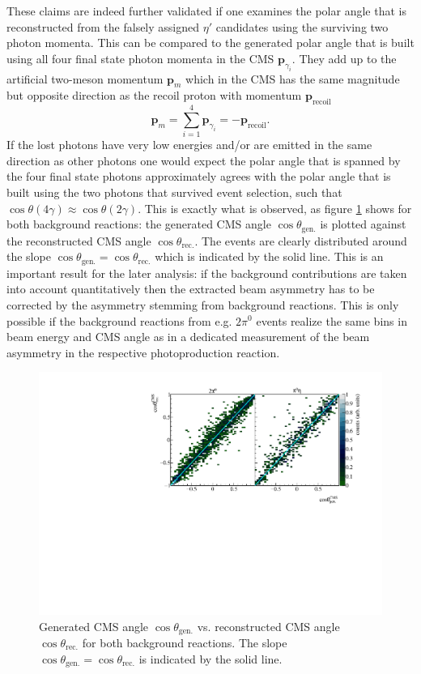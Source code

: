 These claims are indeed further validated if one examines the polar angle that is reconstructed from the falsely assigned $\eta'$ candidates using the surviving two photon momenta. This can be compared to the generated polar angle that is built using all four final state photon momenta in the CMS $\mathbf{p}_{\gamma_i}$. They add up to the artificial two-meson momentum $\mathbf{p}_m$ which in the CMS has the same magnitude but opposite direction as the recoil proton with momentum $\mathbf{p}_\text{recoil}$
$$
	\mathbf{p}_m=\sum_{i=1}^4\mathbf{p}_{\gamma_i}=-\mathbf{p}_\text{recoil}.
$$ If the lost photons have very low energies and/or are emitted in the same direction as other photons one would expect the polar angle that is spanned by the four final state photons approximately agrees with the polar angle that is built using the two photons that survived event selection, such that $\cos\theta(4\gamma)\approx\cos\theta(2\gamma)$. This is exactly what is observed, as figure \ref{fig:mccostheta} shows for both background reactions: the generated CMS angle $\cos\theta_\text{gen.}$ is plotted against the reconstructed CMS angle $\cos\theta_\text{rec.}$. The events are clearly distributed around the slope $\cos\theta_\text{gen.}=\cos\theta_\text{rec.}$ which is indicated by the solid line. This is an important result for the later analysis: if the background contributions are taken into account quantitatively then the extracted beam asymmetry has to be corrected by the asymmetry stemming from background reactions. This is only possible if the background reactions from e.g. $2\pi^0$ events realize the same bins in beam energy and CMS angle as in a dedicated measurement of the beam asymmetry in the respective photoproduction reaction. 
\begin{figure}[htbp]
	\centering
	\includegraphics[width=\linewidth]{../figs/hydrogen/mcgammas_ct.pdf}
	\caption{Generated CMS angle $\cos\theta_\text{gen.}$ vs. reconstructed CMS angle $\cos\theta_\text{rec.}$ for both background reactions. The slope $\cos\theta_\text{gen.}=\cos\theta_\text{rec.}$ is indicated by the solid line.}
	\label{fig:mccostheta}
\end{figure}
